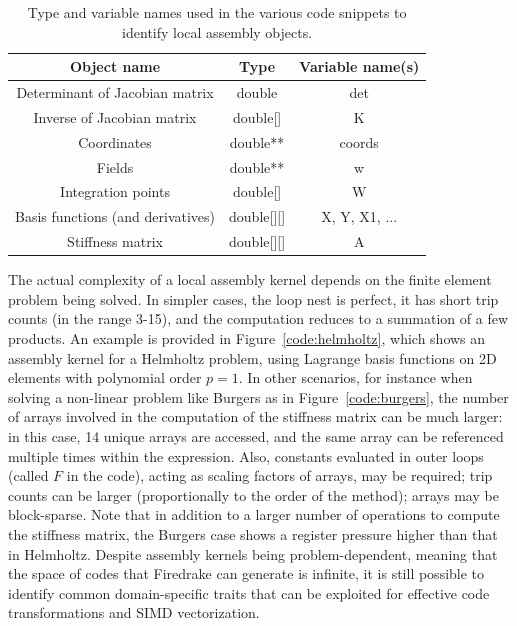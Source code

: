 \documentclass[conference]{IEEEtran}
\begin{document}
\begin{table}[h]
\begin{center}
\begin{tabulary}{1.0\columnwidth}{|C|C|C|}
\hline
Object name & Type & Variable name(s) \\\hline\hline
Determinant of Jacobian matrix & double & det  \\ \hline
Inverse of Jacobian matrix & double[] & K \\ \hline
Coordinates & double** & coords\\ \hline
Fields & double** & w \\ \hline
Integration points & double[] & W \\ \hline
Basis functions (and derivatives) & double[][] & X, Y, X1, ... \\ \hline
Stiffness matrix & double[][] & A\\ \hline
\end{tabulary}
\end{center}
\caption{Type and variable names used in the various code snippets to identify local assembly objects.}
\label{table:map-name-letters}
\end{table}

The actual complexity of a local assembly kernel depends on the finite element problem being solved. In simpler cases, the loop nest is perfect, it has short trip counts (in the range 3-15), and the computation reduces to a summation of a few products. An example is provided in Figure~\ref{code:helmholtz}, which shows an assembly kernel for a Helmholtz problem, using Lagrange basis functions on 2D elements with polynomial order $p=1$. In other scenarios, for instance when solving a non-linear problem like Burgers as in Figure~\ref{code:burgers}, the number of arrays involved in the computation of the stiffness matrix can be much larger: in this case, 14 unique arrays are accessed, and the same array can be referenced multiple times within the expression. Also, constants evaluated in outer loops (called $F$ in the code), acting as scaling factors of arrays, may be required; trip counts can be larger (proportionally to the order of the method); arrays may be block-sparse. Note that in addition to a larger number of operations to compute the stiffness matrix, the Burgers case shows a register pressure higher than that in Helmholtz. Despite assembly kernels being problem-dependent, meaning that the space of codes that Firedrake can generate is infinite, it is still possible to identify common domain-specific traits that can be exploited for effective code transformations and SIMD vectorization.
\end{document}
